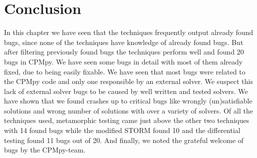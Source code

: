 

\section{Conclusion}
\label{res:conclusion}
In this chapter we have seen that the techniques frequently output already found bugs, since none of the techniques have knowledge of already found bugs. But after filtering previously found bugs the techniques perform well and found 20 bugs in CPMpy. We have seen some bugs in detail with most of them already fixed, due to being easily fixable. We have seen that most bugs were related to the CPMpy code and only one responsible by an external solver. We suspect this lack of external solver bugs to be caused by well written and tested solvers. We have shown that we found crashes up to critical bugs like wrongly (un)satisfiable solutions and wrong number of solutions with over a variety of solvers. Of all the techniques used, metamorphic testing came just above the other two techniques with 14 found bugs while the modified STORM found 10 and the differential testing found 11 bugs out of 20. And finally, we noted the grateful welcome of bugs by the CPMpy-team.

